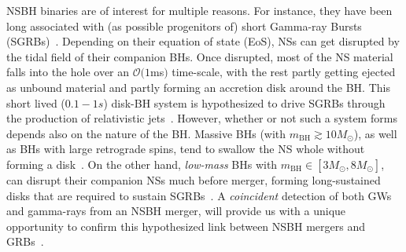 \documentclass[aps,prd,amsmath,floats,floatfix, twocolumn,
superscriptaddress,nofootinbib,showpacs]{revtex4-1}
\newcommand{\red}{\textcolor{red}}
\newcommand{\prayush}{\textcolor{red!40!black}}
\newcommand{\mbh}{m_\mathrm{BH}}
\begin{document}


% 


NSBH binaries are of interest for multiple reasons. For instance,
they have been long associated with (as possible progenitors of) short
Gamma-ray Bursts (SGRBs)~\cite{eichler:89,1992ApJ...395L..83N,moch:93,Barthelmy:2005bx,
2005Natur.437..845F,2005Natur.437..851G,Shibata:2005mz,Paschalidis2014,
Tanvir:2013}. Depending on their equation of state (EoS), NSs can get disrupted by
the tidal field of their companion BHs. Once disrupted, most of the NS
material falls into the hole over an $\mathcal{O}(1$ms$)$ time-scale,
with the rest partly getting ejected as unbound material
and partly forming an accretion disk around the BH.
% 
This short lived ($0.1-1s$) disk-BH system is hypothesized to drive SGRBs
through the production of relativistic jets~\cite{Foucart:2015a,
Lovelace:2013vma,Deaton2013,Foucart2012,Shibata:2005mz,Paschalidis2014}.
% 
However, whether or not such a system forms depends also on the nature of
the BH. Massive BHs (with $\mbh\gtrsim 10M_\odot$), as well as BHs with
large retrograde spins, tend to swallow the NS whole without forming a
disk~\cite{Foucart:2013psa}. 
% 
On the other hand, {\it low-mass} BHs with $\mbh\in[3M_\odot, 8M_\odot]$, 
can disrupt their companion NSs much before merger, forming long-sustained disks
that are required to sustain 
SGRBs~\cite{Shibata:2007zm,2010PhRvD..81f4026F,Lovelace:2013vma,Kawaguchi:2015}.
% 
A {\it coincident} detection of both GWs and gamma-rays from an NSBH merger,
will
provide us with a unique opportunity to confirm this hypothesized link between
NSBH mergers and GRBs~\cite{Abbott:2016wya}.
\end{document}
